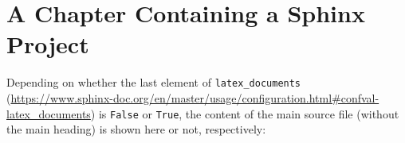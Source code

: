 \documentclass[a4paper]{book}
\begin{document}
\chapter{A Chapter Containing a Sphinx Project}

Depending on whether the last element of \texttt{latex\_documents}
(\url{https://www.sphinx-doc.org/en/master/usage/configuration.html#confval-latex_documents})
is \texttt{False} or \texttt{True},
the content of the main source file (without the main heading)
is shown here or not, respectively:



\printbibliography[title=References,heading=bibintoc]
\end{document}
